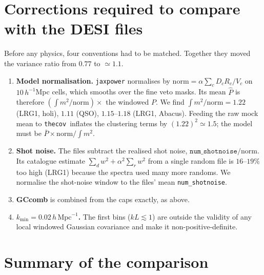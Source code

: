 \documentclass[11pt]{article}
\newcommand{\thecov}{\texttt{thecov}}
\newcommand{\hk}{\,h\,\mathrm{Mpc}^{-1}}
\begin{document}
\section{Corrections required to compare with the DESI files}
\label{sec:corrections}

Before any physics, four conventions had to be matched. Together they moved the variance ratio from $0.77$ to $\simeq1.1$.
\begin{enumerate}
\item \textbf{Model normalisation.} \texttt{jaxpower} normalises by $\mathrm{norm}=\alpha\sum_c D_cR_c/V_c$ on $10\,h^{-1}$Mpc cells, which smooths over the fine veto masks. Its mean $\hat P$ is therefore $(\int m^2/\mathrm{norm})\times$ the windowed $P$. We find $\int m^2/\mathrm{norm}=1.22$ (LRG1, holi), $1.11$ (QSO), $1.15$--$1.18$ (LRG1, Abacus). Feeding the raw mock mean to \thecov\ inflates the clustering terms by $(1.22)^2\simeq1.5$; the model must be $\bar P\times\mathrm{norm}/\!\int m^2$.
\item \textbf{Shot noise.} The files subtract the realised shot noise, $\texttt{num\_shotnoise}/\mathrm{norm}$. Its catalogue estimate $\sum_d w^2+\alpha^2\sum_r w^2$ from a single random file is $16$--$19\%$ too high (LRG1) because the spectra used many more randoms. We normalise the shot-noise window to the files' mean \texttt{num\_shotnoise}.
\item \textbf{GCcomb} is combined from the caps exactly, as above.
\item \textbf{$k_{\min}=0.02\hk$.} The first bins ($kL\lesssim1$) are outside the validity of any local windowed Gaussian covariance and make it non-positive-definite.
\end{enumerate}

\section{Summary of the comparison}
\label{sec:summary}
\end{document}
